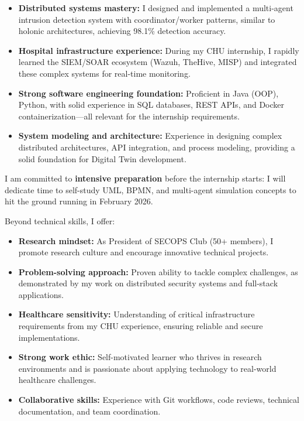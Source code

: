 \documentclass[11pt, a4paper]{awesome-cv}
\begin{document}
\begin{cvletter}
    \begin{itemize}
        \item \textbf{Distributed systems mastery:} I designed and implemented a multi-agent intrusion detection system with coordinator/worker patterns, similar to holonic architectures, achieving 98.1\% detection accuracy.
        \item \textbf{Hospital infrastructure experience:} During my CHU internship, I rapidly learned the SIEM/SOAR ecosystem (Wazuh, TheHive, MISP) and integrated these complex systems for real-time monitoring.
        \item \textbf{Strong software engineering foundation:} Proficient in Java (OOP), Python, with solid experience in SQL databases, REST APIs, and Docker containerization—all relevant for the internship requirements.
        \item \textbf{System modeling and architecture:} Experience in designing complex distributed architectures, API integration, and process modeling, providing a solid foundation for Digital Twin development.
    \end{itemize}

    I am committed to \textbf{intensive preparation} before the internship starts: I will dedicate time to self-study UML, BPMN, and multi-agent simulation concepts to hit the ground running in February 2026.


    Beyond technical skills, I offer:

    \begin{itemize}
        \item \textbf{Research mindset:} As President of SECOPS Club (50+ members), I promote research culture and encourage innovative technical projects.
        \item \textbf{Problem-solving approach:} Proven ability to tackle complex challenges, as demonstrated by my work on distributed security systems and full-stack applications.
        \item \textbf{Healthcare sensitivity:} Understanding of critical infrastructure requirements from my CHU experience, ensuring reliable and secure implementations.
        \item \textbf{Strong work ethic:} Self-motivated learner who thrives in research environments and is passionate about applying technology to real-world healthcare challenges.
        \item \textbf{Collaborative skills:} Experience with Git workflows, code reviews, technical documentation, and team coordination.
    \end{itemize}


\end{cvletter}
\end{document}

